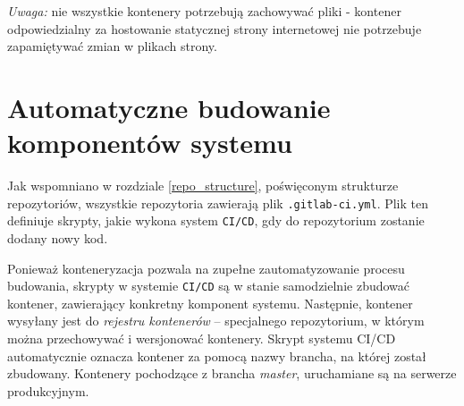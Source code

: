 \textit{Uwaga:} nie wszystkie kontenery potrzebują zachowywać pliki - kontener
odpowiedzialny za hostowanie statycznej strony internetowej nie potrzebuje
zapamiętywać zmian w plikach strony. 

\section{Automatyczne budowanie komponentów systemu}

Jak wspomniano w rozdziale \ref{repo_structure}, poświęconym strukturze repozytoriów,
wszystkie repozytoria zawierają plik \texttt{.gitlab-ci.yml}. Plik ten definiuje skrypty,
jakie wykona system \texttt{CI/CD}, gdy do repozytorium zostanie dodany nowy kod.

Ponieważ konteneryzacja pozwala na zupełne zautomatyzowanie procesu budowania,
skrypty w systemie \texttt{CI/CD} są w stanie samodzielnie zbudować kontener,
zawierający konkretny komponent systemu. Następnie, kontener wysyłany jest
do \textit{rejestru kontenerów} -- specjalnego repozytorium, w którym można
przechowywać i wersjonować kontenery. Skrypt systemu CI/CD automatycznie oznacza
kontener za pomocą nazwy brancha, na której został zbudowany. Kontenery pochodzące
z brancha \textit{master}, uruchamiane są na serwerze produkcyjnym.

